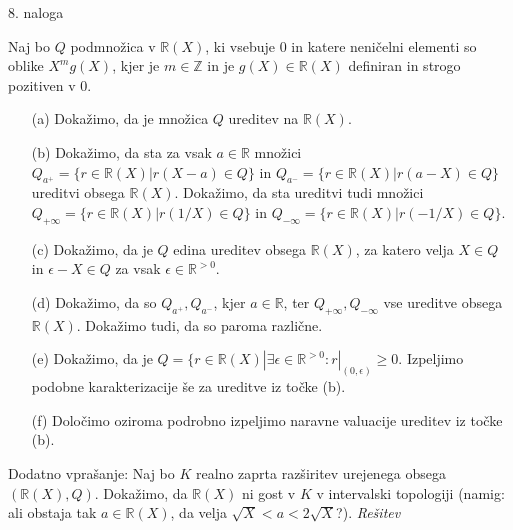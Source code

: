 \documentclass[a4paper, 12pt]{article}
\newcommand{\Z}{\mathbb{Z}}
\newcommand{\R}{\mathbb{R}}
\begin{document}
\begin{flushleft}
8. naloga
\end{flushleft}
Naj bo $Q$ podmnožica v $\R(X)$, ki vsebuje 0 in katere neničelni elementi so oblike $X^m g(X)$, kjer je $m\in \Z$ in je $g(X) \in \R(X)$ definiran in strogo pozitiven v 0.
\begin{enumerate}
\item[(a)] Dokažimo, da je množica $Q$ ureditev na $\R(X)$.
\item[(b)] Dokažimo, da sta za vsak $a\in \R$ množici $Q_{a^+} = \{r\in \R(X)| r(X-a) \in Q\}$ in $Q_{a^-} = \{ r \in \R(X)| r(a-X) \in Q\}$ ureditvi obsega $\R(X)$. Dokažimo, da sta ureditvi tudi množici $Q_{+\infty} = \{r\in \R(X)|r(1/X) \in Q\}$ in $Q_{-\infty} = \{r \in \R(X)| r(-1/X) \in Q\}$. 
\item[(c)] Dokažimo, da je $Q$ edina ureditev obsega $\R(X)$, za katero velja $X\in Q$ in $\epsilon - X \in Q$ za vsak $\epsilon \in \R^{>0}$.
\item[(d)] Dokažimo, da so $Q_{a^+}, Q_{a^-}$, kjer $a\in \R$, ter $Q_{+\infty}, Q_{-\infty}$ vse ureditve obsega $\R(X)$. Dokažimo tudi, da so paroma različne.
\item[(e)] Dokažimo, da je $Q = \{r\in \R(X)| \exists \epsilon \in \R^{>0}: r|_{(0,\epsilon)} \ge 0$. Izpeljimo podobne karakterizacije še za ureditve iz točke (b).
\item[(f)] Določimo oziroma podrobno izpeljimo naravne valuacije ureditev iz točke (b).
\end{enumerate}
Dodatno vprašanje: Naj bo $K$ realno zaprta razširitev urejenega obsega $(\R(X),Q)$. Dokažimo, da $\R(X)$ ni gost v $K$ v intervalski topologiji (namig: ali obstaja tak $a \in \R(X)$, da velja $\sqrt{X} < a < 2\sqrt{X}$?).
\newline
\emph{Rešitev}
\end{document}
